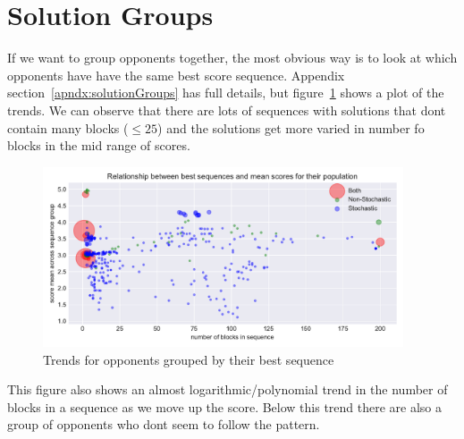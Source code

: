 \section{Solution Groups}\label{sec:solutionGroups}
If we want to group opponents together, the most obvious way is to look at which opponents have have the same best score sequence.
Appendix section~\ref{apndx:solutionGroups} has full details, but figure~\ref{fig:sequence_scatter} shows a plot of the trends. 
We can observe that there are lots of sequences with solutions that dont contain many blocks ($\le 25$) and the solutions get more varied in number fo blocks in the mid range of scores.
\begin{figure}[ht]
    \includegraphics[width=0.95\textwidth, center]{./img/descriptive/sequence_scatter_colour.pdf}
    \caption{Trends for opponents grouped by their best sequence}\label{fig:sequence_scatter}
\end{figure}

This figure also shows an almost logarithmic/polynomial trend in the number of blocks in a sequence as we move up the score.
Below this trend there are also a group of opponents who dont seem to follow the pattern. 

